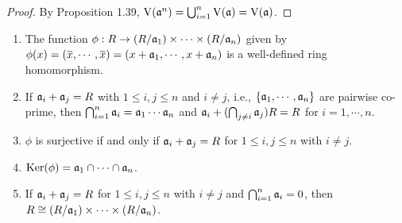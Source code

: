 \begin{proof}
    By Proposition 1.39, $\operatorname{V}(\mathfrak{a}^n) = \bigcup_{i=1}^n \operatorname{V}(\mathfrak{a}) = \operatorname{V}(\mathfrak{a})$.
\end{proof}

\begin{proposition}
    \begin{enumerate}
        \item The function $\phi: R \to (R/\mathfrak{a}_1) \times \cdots \times (R/\mathfrak{a}_n)$ given by $\phi(x) = (\overbar x, \cdots, \overbar x) = (x+\ffa_1,\cdots,x+\ffa_n)$ is a well-defined ring homomorphism.
        \item If $\mathfrak{a}_i + \mathfrak{a}_j = R$ with $1 \leq i,j \leq n$ and $i \neq j$, i.e., $\{\mathfrak{a}_1,\cdots,\mathfrak{a}_n\}$ are pairwise co-prime, then $\bigcap_{i=1}^n \mathfrak{a}_i = \mathfrak{a}_1 \cdots \mathfrak{a}_n$ and $\mathfrak{a}_i + (\bigcap_{j \neq i} \mathfrak{a}_j)R = R$ for $i = 1,\cdots,n$.
        \item $\phi$ is surjective if and only if $\mathfrak{a}_i + \mathfrak{a}_j = R$ for $1 \leq i,j \leq n$ with $i \neq j$.
        \item $\operatorname{Ker}(\phi) = \mathfrak{a}_1 \cap \cdots \cap \mathfrak{a}_n$.
        \item If $\mathfrak{a}_i + \mathfrak{a}_j = R$ for $1 \leq i,j \leq n$ with $i \neq j$ and $\bigcap_{i=1}^n \mathfrak{a}_i = 0$, then $R \cong (R/\mathfrak{a}_1) \times \cdots \times(R/\mathfrak{a}_n)$.
    \end{enumerate}
\end{proposition}

